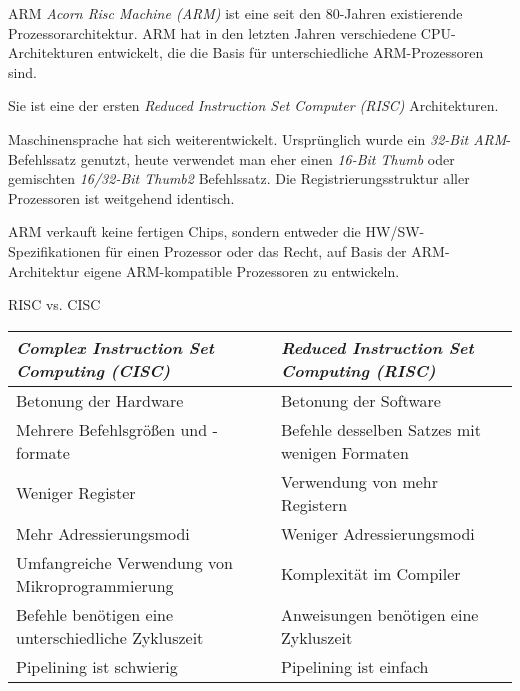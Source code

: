 \begin{defi}{ARM}
    \emph{Acorn Risc Machine (ARM)} ist eine seit den 80-Jahren existierende Prozessorarchitektur.
    ARM hat in den letzten Jahren verschiedene CPU-Architekturen entwickelt, die die Basis für unterschiedliche ARM-Prozessoren sind.

    Sie ist eine der ersten \emph{Reduced Instruction Set Computer (RISC)} Architekturen.

    Maschinensprache hat sich weiterentwickelt.
    Ursprünglich wurde ein \emph{32-Bit ARM}-Befehlssatz genutzt, heute verwendet man eher einen \emph{16-Bit Thumb} oder gemischten \emph{16/32-Bit Thumb2} Befehlssatz.
    Die Registrierungsstruktur aller Prozessoren ist weitgehend identisch.

    ARM verkauft keine fertigen Chips, sondern entweder die HW/SW-Spezifikationen für einen Prozessor oder das Recht, auf Basis der ARM-Architektur eigene ARM-kompatible Prozessoren zu entwickeln.
\end{defi}

\begin{bonus}{RISC vs. CISC}
    \begin{tabularx}{\textwidth}{|X|X|}
        \hline
        \emph{Complex Instruction Set Computing (CISC)}    & \emph{Reduced Instruction Set Computing (RISC)} \\\hline\hline
        Betonung der Hardware                              & Betonung der Software                           \\\hline
        Mehrere Befehlsgrößen und -formate                 & Befehle desselben Satzes mit wenigen Formaten   \\\hline
        Weniger Register                                   & Verwendung von mehr Registern                   \\\hline
        Mehr Adressierungsmodi                             & Weniger Adressierungsmodi                       \\\hline
        Umfangreiche Verwendung von Mikroprogrammierung    & Komplexität im Compiler                         \\\hline
        Befehle benötigen eine unterschiedliche Zykluszeit & Anweisungen benötigen eine Zykluszeit           \\\hline
        Pipelining ist schwierig                           & Pipelining ist einfach                          \\\hline
    \end{tabularx}
\end{bonus}

